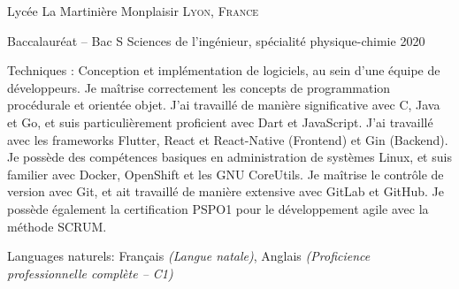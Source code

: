 \documentclass[10pt,a4paper]{article} %
\begin{document}

\headedsection %
{Lycée La Martinière Monplaisir}
{\textsc{Lyon, France}} {

    \headedsubsection %
    {Baccalauréat -- Bac S Sciences de l'ingénieur, spécialité physique-chimie}
    {2020} {}
}

\spacedhrule{0.5em}{-0.4em} %



\inlineheadsection %
{Techniques :}
{Conception et implémentation de logiciels,
    au sein d'une équipe de développeurs. Je maîtrise correctement les concepts de programmation procédurale et
    orientée objet. J'ai travaillé de manière significative avec C, Java et Go,
    et suis particulièrement proficient avec Dart et JavaScript. J'ai travaillé avec les frameworks Flutter, React et React-Native
    (Frontend)
    et Gin (Backend). Je possède des compétences basiques en administration de systèmes Linux,
    et suis familier avec Docker, OpenShift et les GNU CoreUtils. Je maîtrise le contrôle de version avec Git,
    et ait travaillé de manière extensive avec GitLab et GitHub. Je possède également la certification PSPO1 pour le développement agile avec la méthode SCRUM.}



\inlineheadsection %
{Languages naturels:}
{Français \textit{(Langue natale)}, Anglais \textit{(Proficience professionnelle complète -- C1)}}
\end{document}
